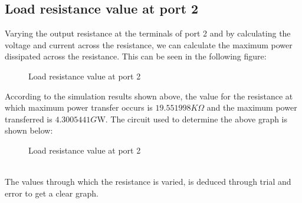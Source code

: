 \documentclass{report}[12pt]
\begin{document}
\subsection*{Load resistance value at port 2}
Varying the output resistance at the terminals of port 2 and by calculating the voltage and current across the resistance, we can calculate the maximum power dissipated across the resistance.
This can be seen in the following figure:
\begin{center}
    \begin{figure}[ht]
        \centering
        \caption{Load resistance value at port 2}
    \end{figure}
\end{center}
According to the simulation results shown above, the value for the resistance at which maximum power transfer occurs is $19.551998K\Omega$ and the maximum power transferred is $4.3005441G$W.
The circuit used to determine the above graph is shown below:
\begin{figure}[ht]
    \centering
    \caption{Load resistance value at port 2}
\end{figure}\\
The values through which the resistance is varied, is deduced through trial and error to get a clear graph.
\end{document}
